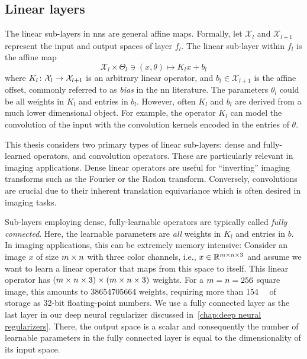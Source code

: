 \subsection{Linear layers}
The linear sub-layers in \glspl{nn} are general affine maps.
Formally, let \( \mathcal{X}_l \) and \( \mathcal{X}_{l+1} \) represent the input and output spaces of layer \( f_l \).
The linear sub-layer within \( f_l \) is the affine map
\begin{equation}
	\mathcal{X}_l \times \Theta_l \ni (x, \theta) \mapsto K_lx + b_l
\end{equation}
where \( K_l \colon \mathcal{X}_l \to \mathcal{X}_{l + \num{1}} \) is an arbitrary linear operator, and \( b_l \in \mathcal{X}_{l + \num{1}} \) is the affine offset, commonly referred to as \emph{bias} in the \gls{nn} literature.
The parameters \( \theta_l \) could be all weights in \( K_l \) and entries in \( b_l \).
However, often \( K_l \) and \( b_l \) are derived from a much lower dimensional object.
For example, the operator \( K_l \) can model the convolution of the input with the convolution kernels encoded in the entries of \( \theta \).

This thesis considers two primary types of linear sub-layers:
dense and fully-learned operators, and convolution operators.
These are particularly relevant in imaging applications.
Dense linear operators are useful for \enquote{inverting} imaging transforms such as the Fourier or the Radon transform.
Conversely, convolutions are crucial due to their inherent translation equivariance which is often desired in imaging tasks.

Sub-layers employing dense, fully-learnable operators are typically called \emph{fully connected}.
Here, the learnable parameters are \emph{all} weights in \( K_l \) and entries in \( b \).
In imaging applications, this can be extremely memory intensive:
Consider an image \( x \) of size \( m \times n \) with three color channels, i.e., \( x \in \mathbb{R}^{m \times n \times \num{3}} \) and assume we want to learn a linear operator that maps from this space to itself.
This linear operator has \( (m \times n \times \num{3}) \times (m \times n \times \num{3}) \) weights.
For a \( m = n = \num{256} \) square image, this amounts to \num{38654705664} weights, requiring more than \qty{154}{\giga\byte} of storage as \num{32}-bit floating-point numbers.
We use a fully connected layer as the last layer in our deep neural regularizer discussed in~\cref{chap:deep neural regularizers}.
There, the output space is a scalar and consequently the number of learnable parameters in the fully connected layer is equal to the dimensionality of its input space.


